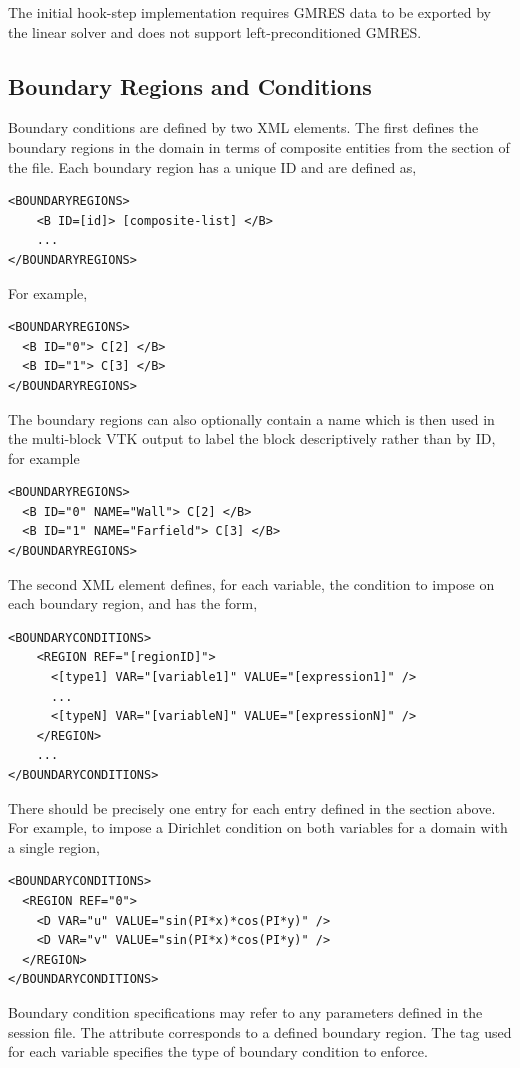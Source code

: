 The initial hook-step implementation requires GMRES data to be exported by the
linear solver and does not support left-preconditioned GMRES.

\subsection{Boundary Regions and Conditions}

Boundary conditions are defined by two XML elements. The first defines the
boundary regions in the domain in terms of composite entities from the
 section of the file. Each boundary region has a unique ID and
are defined as, 
\begin{lstlisting}[style=XMLStyle]
<BOUNDARYREGIONS>
    <B ID=[id]> [composite-list] </B>
    ...
</BOUNDARYREGIONS>
\end{lstlisting}
For example,
\begin{lstlisting}[style=XMLStyle]
<BOUNDARYREGIONS>
  <B ID="0"> C[2] </B>
  <B ID="1"> C[3] </B>
</BOUNDARYREGIONS>
\end{lstlisting}

The boundary regions can also optionally contain a name which is then used in the
multi-block VTK output to label the block descriptively rather than by ID, for
example
\begin{lstlisting}[style=XMLStyle]
<BOUNDARYREGIONS>
  <B ID="0" NAME="Wall"> C[2] </B>
  <B ID="1" NAME="Farfield"> C[3] </B>
</BOUNDARYREGIONS>
\end{lstlisting}

The second XML element defines, for each variable, the condition to impose on
each boundary region, and has the form,
\begin{lstlisting}[style=XMLStyle]
<BOUNDARYCONDITIONS>
    <REGION REF="[regionID]">
      <[type1] VAR="[variable1]" VALUE="[expression1]" />
      ...
      <[typeN] VAR="[variableN]" VALUE="[expressionN]" />
    </REGION>
    ...
</BOUNDARYCONDITIONS>
\end{lstlisting}
There should be precisely one  entry for each  entry
defined in the  section above. For example, to impose a
Dirichlet condition on both variables for a domain with a single region, 
\begin{lstlisting}[style=XMLStyle] 
<BOUNDARYCONDITIONS>
  <REGION REF="0">
    <D VAR="u" VALUE="sin(PI*x)*cos(PI*y)" /> 
    <D VAR="v" VALUE="sin(PI*x)*cos(PI*y)" />
  </REGION>
</BOUNDARYCONDITIONS>
\end{lstlisting}
Boundary condition specifications may refer to any parameters defined in the
session file. The  attribute corresponds to a defined boundary
region. The tag used for each variable specifies the type of boundary condition
to enforce.


